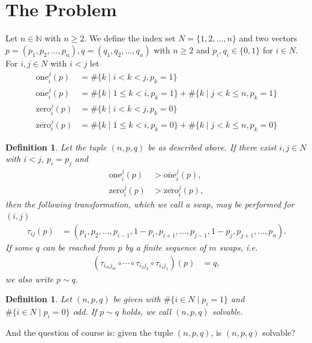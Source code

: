 \documentclass[12pt]{article}
\newtheorem{defn}[thm]{Definition}
\begin{document}
\section{The Problem}
Let $n\in\mathbb{N}$ with $n\geq 2$. We define the index set $N=\{1, 2,\dots, n\}$ and two vectors $p = (p_1, p_2, \dots, p_n), q = (q_1, q_2, \dots, q_n)$ with $n\geq 2$ and $p_i, q_i \in \{0, 1\}$ for $i\in N$.
For $i,j \in N$ with $i<j$ let
\begin{align*}
\mathrm{one}_i^j(p) &=   \#\{ k \mid i< k < j, p_k=1 \}
\\
\overline{\mathrm{one}}_i^j(p) &=  \#\{ k \mid 1\leq k<i, p_k=1 \}
+
\#\{ k \mid j< k\leq n, p_k=1 \}
\\
\mathrm{zero}_i^j(p) 
&=   \#\{ k\mid i< k < j, p_k=0 \}
\\
\overline{\mathrm{zero}}_i^j(p) 
&=   \#\{ k\mid 1\leq k < i, p_k=0 \}
+  \#\{ k\mid j< k \leq n, p_k=0 \}
\end{align*}

\begin{defn}
Let the tuple $(n, p, q)$ be as described above.
If there exist $i, j \in N$ with $i<j$, $p_i = p_j$ and
\begin{align}
\mathrm{one}_i^{j}(p)
&> 
\overline{\mathrm{one}}_i^{j}(p),
\label{eq:condition for swap -> ones_greater}
\\
\mathrm{zero}_i^{j}(p)
&> 
\overline{\mathrm{zero}}_i^{j}(p),
\label{eq:condition for swap -> zeros_greater}
\end{align}
then the following transformation, which we call a swap, may be performed for $(i, j)$
\begin{align*}
\tau_{ij}(p) 
&= (p_1, p_2, \dots, p_{i-1}, 1-p_i, p_{i+1},\dots, p_{j-1}, 1-p_j, p_{j+1},\dots, p_n).
\end{align*}
If some $q$ can be reached from $p$ by a finite sequence of $m$ swaps, i.e.
\begin{align}
(\tau_{i_mj_m} \circ \cdots \circ \tau_{i_2j_2}\circ \tau_{i_1j_1}) (p) 
&= 
q,
\label{eq:p=q via swaps}
\end{align}
we also write $p\sim q$.
\end{defn}

\begin{defn}
Let $(n, p, q)$ be given with $\#\{ i \in N\mid p_i=1 \}$ and $\#\{ i \in N\mid p_i=0 \}$ odd.
If $p\sim q$ holds, we call $(n, p, q)$ solvable.
\label{defn:problem description}
\end{defn}
\noindent And the question of course is: given the tuple $(n, p, q)$, is $(n, p, q)$ solvable?
\end{document}
